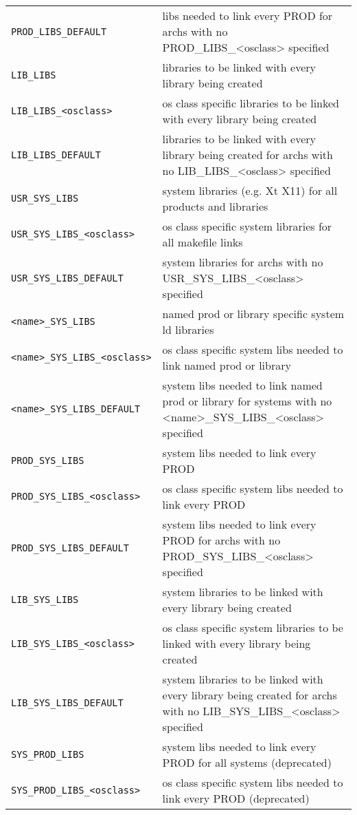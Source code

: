 \begin{center}
\begin{longtable}{p{2.94784in}p{3.76247in}}
\verb|PROD_LIBS_DEFAULT| & libs needed to link every PROD for archs with no PROD\_LIBS\_\textless{}osclass\textgreater{} specified\\
\verb|LIB_LIBS| & libraries to be linked with every library being created\\
\verb|LIB_LIBS_<osclass>| & os class specific libraries to be linked with every library being created\\
\verb|LIB_LIBS_DEFAULT| & libraries to be linked with every library being created for archs with no LIB\_LIBS\_\textless{}osclass\textgreater{} specified\\
\verb|USR_SYS_LIBS| & system libraries (e.g. Xt X11) for all products and libraries\\
\verb|USR_SYS_LIBS_<osclass>| & os class specific system libraries for all makefile links\\
\verb|USR_SYS_LIBS_DEFAULT| & system libraries for archs with no USR\_SYS\_LIBS\_\textless{}osclass\textgreater{} specified\\
\verb|<name>_SYS_LIBS| & named prod or library specific system ld libraries\\
\verb|<name>_SYS_LIBS_<osclass>| & os class specific system libs needed to link named prod or library\\
\verb|<name>_SYS_LIBS_DEFAULT| & system libs needed to link named prod or library for systems with no \textless{}name\textgreater{}\_SYS\_LIBS\_\textless{}osclass\textgreater{} specified\\
\verb|PROD_SYS_LIBS| & system libs needed to link every PROD\\
\verb|PROD_SYS_LIBS_<osclass>| & os class specific system libs needed to link every PROD\\
\verb|PROD_SYS_LIBS_DEFAULT| & system libs needed to link every PROD for archs with no PROD\_SYS\_LIBS\_\textless{}osclass\textgreater{} specified\\
\verb|LIB_SYS_LIBS| & system libraries to be linked with every library being created\\
\verb|LIB_SYS_LIBS_<osclass>| & os class specific system libraries to be linked with every library being created\\
\verb|LIB_SYS_LIBS_DEFAULT| & system libraries to be linked with every library being created for archs with no LIB\_SYS\_LIBS\_\textless{}osclass\textgreater{} specified\\
\verb|SYS_PROD_LIBS| & system libs needed to link every PROD for all systems (deprecated)\\
\verb|SYS_PROD_LIBS_<osclass>| & os class specific system libs needed to link every PROD (deprecated)\\

\end{longtable}
\end{center}
